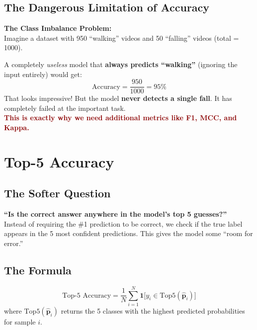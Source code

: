 \documentclass[12pt, a4paper]{article}
\begin{document}
\subsection{The Dangerous Limitation of Accuracy}

\begin{warningbox}
\textbf{The Class Imbalance Problem:}\\[0.3cm]
Imagine a dataset with 950 ``walking'' videos and 50 ``falling'' videos (total = 1000).

A completely \textit{useless} model that \textbf{always predicts ``walking''} (ignoring the input entirely) would get:
\[
\text{Accuracy} = \frac{950}{1000} = 95\%
\]
That looks impressive! But the model \textbf{never detects a single fall}. It has completely failed at the important task.\\[0.3cm]
\textcolor{darkred}{\textbf{This is exactly why we need additional metrics like F1, MCC, and Kappa.}}
\end{warningbox}


\newpage
\section{Top-5 Accuracy}

\subsection{The Softer Question}

\begin{keyidea}
\textbf{``Is the correct answer anywhere in the model's top 5 guesses?''}\\[0.3cm]
Instead of requiring the \#1 prediction to be correct, we check if the true label appears in the 5 most confident predictions. This gives the model some ``room for error.''
\end{keyidea}

\subsection{The Formula}

\begin{formulabox}
\[
\boxed{\text{Top-5 Accuracy} = \frac{1}{N}\sum_{i=1}^{N} \mathbf{1}\big[y_i \in \text{Top5}(\hat{\mathbf{p}}_i)\big]}
\]
where $\text{Top5}(\hat{\mathbf{p}}_i)$ returns the 5 classes with the highest predicted probabilities for sample $i$.
\end{formulabox}
\end{document}
